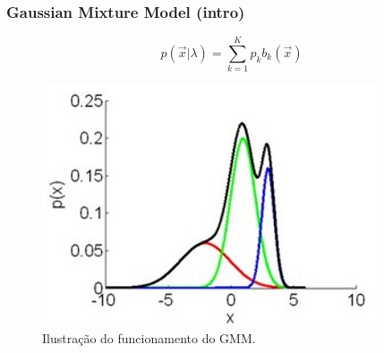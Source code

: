 \documentclass{beamer}
\begin{document}
\begin{frame}

	\frametitle{Gaussian Mixture Model (intro)}
	
	\begin{minipage}{.45\textwidth}
	
		\begin{equation}
			p(\vec{x}|\lambda) = \sum_{k=1}^{K} p_kb_k(\vec{x})
			\label{eq:gmm}
		\end{equation}
	
	\end{minipage}
	\begin{minipage}{.5\textwidth}
		\begin{figure}
			\includegraphics[width=\linewidth]{gmm01.jpg}
  			\caption{Ilustração do funcionamento do GMM.}
  			\label{fig:gmm1}
		\end{figure}
	\end{minipage}
	
\end{frame}
\end{document}
